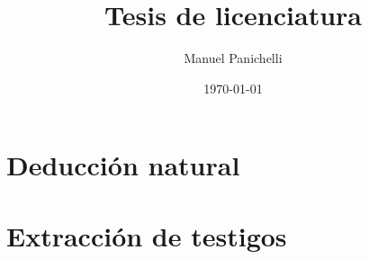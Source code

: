 \documentclass{report}
\title{Tesis de licenciatura}
\author{
    Manuel Panichelli
}
\date{\today}
\begin{document}
\maketitle

\chapter{Deducción natural}


\cite{FreekBy}



\chapter{Extracción de testigos}



\printbibliography
\end{document}
